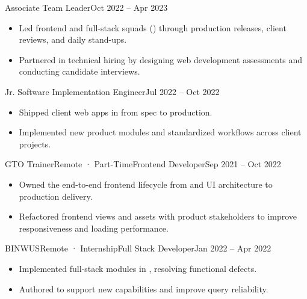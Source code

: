 
\begin{TimelineRole}{Associate Team Leader}{Oct 2022 – Apr 2023}
    \begin{itemize}
        \item Led frontend and full-stack squads () through production releases, client reviews, and daily stand-ups.
        \item Partnered in technical hiring by designing web development assessments and conducting candidate interviews.
    \end{itemize}
\end{TimelineRole}

\begin{TimelineRole}[last]{Jr. Software Implementation Engineer}{Jul 2022 – Oct 2022}
    \begin{itemize}
        \item Shipped client web apps in  from spec to production.
        \item Implemented new product modules and standardized  workflows across client projects.
    \end{itemize}
\end{TimelineRole}

\begin{SingleRole}{GTO Trainer}{Remote · Part-Time}{Frontend Developer}{Sep 2021 – Oct 2022}
    \begin{itemize}
        \item Owned the end-to-end frontend lifecycle from  and UI architecture to production delivery.
        \item Refactored frontend views and assets with product stakeholders to improve responsiveness and loading performance.
    \end{itemize}
\end{SingleRole}

\begin{SingleRole}[last]{BINWUS}{Remote · Internship}{Full Stack Developer}{Jan 2022 – Apr 2022}
    \begin{itemize}
        \item Implemented full-stack modules in , resolving functional defects.
        \item Authored  to support new capabilities and improve query reliability.
    \end{itemize}
\end{SingleRole}

